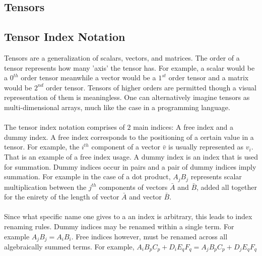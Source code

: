\documentclass[a4paper, 12pt]{report}
\begin{document}
\begin{center}
\chapter{Tensors}
\begin{comment}
\end{comment}
\section{Tensor Index Notation}
\begin{comment}
\end{comment}
Tensors are a generalization of scalars, vectors, and matrices. The order of a tensor represents how many 'axis' the tensor has. For example, a scalar would be a $0^{th}$ order tensor meanwhile a vector would be a $1^{st}$ order tensor and a matrix would be $2^{nd}$ order tensor. Tensors of higher orders are permitted though a visual representation of them is meaningless. One can alternatively imagine tensors as multi-dimensional arrays, much like the case in a programming language.
 \\~\\The tensor index notation comprises of $2$ main indices: A free index and a dummy index. A free index corresponds to the positioning of a certain value in a tensor. For example, the $i^{th}$ component of a vector $\bar{v}$ is usually represented as $v_{i}$. That is an example of a free index usage. A dummy index is an index that is used for summation. Dummy indices occur in pairs and a pair of dummy indices imply summation. For example in the case of a dot product, $A_{j}B_{j}$ represents scalar multiplication between the $j^{th}$ components of vectors $\bar{A}$ and $\bar{B}$, added all together for the enirety of the length of vector $\bar{A}$ and vector $\bar{B}$.
\\~\\Since what specific name one gives to a an index is arbitrary, this leads to index renaming rules. Dummy indices may be renamed within a single term. For example $A_{j}B_{j} = A_{i}B_{i}$. Free indices however, must be renamed across all algebraically summed terms. For example, $A_{i}B_{p}C_{p} + D_{i}E_{q}F_{q} = A_{j}B_{p}C_{p} + D_{j}E_{q}F_{q}$

\end{center}
\end{document}
